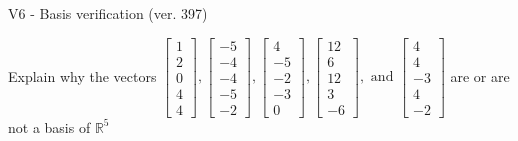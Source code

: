 \begin{exercise}
  \begin{exerciseTitle}V6 - Basis verification (ver. 397)\end{exerciseTitle}
  \begin{exerciseStatement}
    Explain why the vectors \(\left[\begin{array}{r}
1 \\
2 \\
0 \\
4 \\
4
\end{array}\right] , \left[\begin{array}{r}
-5 \\
-4 \\
-4 \\
-5 \\
-2
\end{array}\right] , \left[\begin{array}{r}
4 \\
-5 \\
-2 \\
-3 \\
0
\end{array}\right] , \left[\begin{array}{r}
12 \\
6 \\
12 \\
3 \\
-6
\end{array}\right] , \text{ and } \left[\begin{array}{r}
4 \\
4 \\
-3 \\
4 \\
-2
\end{array}\right]\) are or are not a basis of \(\mathbb{R}^5\)	



\end{exerciseStatement}
\end{exercise}
